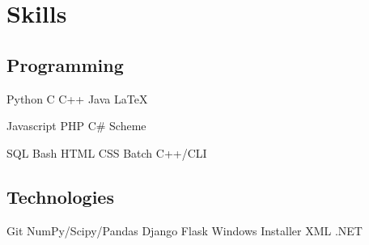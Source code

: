 \documentclass[letterpaper]{deedy-resume} %
\newcommand{\bul}{\textbullet{}}
\begin{document}
\begin{minipage}[t]{0.33\textwidth}
\section{Skills}

\subsection{Programming}


Python \bul C \bul C++ \bul Java \bul \LaTeX


Javascript \bul PHP \bul C\# \bul Scheme


SQL \bul Bash \bul HTML \bul CSS \bul Batch \bul C++/CLI

\sectionspace %

\subsection{Technologies}

Git \bul NumPy/Scipy/Pandas \bul Django \bul Flask \bul Windows Installer XML
\bul .NET


\end{minipage} %
\hfill
%
%
\end{document}
